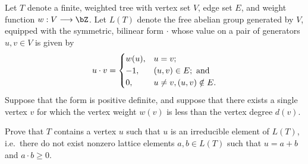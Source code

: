 Let $T$ denote a finite, weighted tree with vertex set $V$, edge set $E$, and weight function $w : V \longrightarrow \bZ$.
Let $L(T)$ denote the free abelian group generated by $V$, equipped with the symmetric, bilinear form $\cdot$ whose value on a pair of generators $u,v \in V$ is given by 
\[
u \cdot v = 
\begin{cases}
    w(u), & u=v; \\
    -1, & (u,v) \in E; \textup{ and} \\
    0, & u \ne v, (u,v) \notin E.
\end{cases}
\]
Suppose that the form is positive definite, and suppose that there exists a single vertex $v$ for which the vertex weight $w(v)$ is less than the vertex degree $d(v)$.

Prove that $T$ contains a vertex $u$ such that $u$ is an irreducible element of $L(T)$, i.e.~there do not exist nonzero lattice elements $a,b \in L(T)$ such that $u = a+b$ and $a \cdot b \ge 0$.